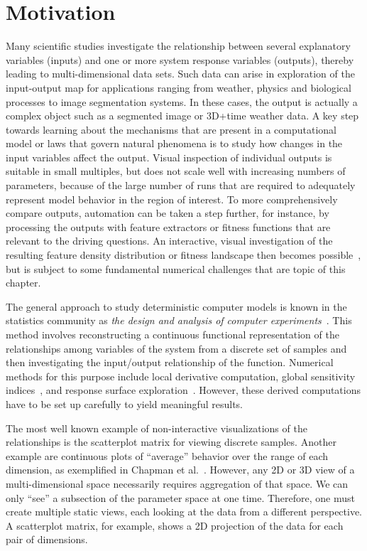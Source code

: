 
\section{Motivation}

Many scientific studies investigate the relationship between
several explanatory variables (inputs) and one or more system response
variables (outputs), thereby leading to multi-dimensional data sets.  Such data
can arise in exploration of the input-output map for applications ranging from
weather, physics and biological processes to image segmentation systems.  
In these cases, the output
is actually a complex object such as a segmented image or 3D+time weather data.
A key step towards learning about the mechanisms that are present in a
computational model or laws that govern natural phenomena is to study how
changes in the input variables affect the output.  Visual inspection of
individual outputs is suitable in small multiples, but does not scale well with
increasing numbers of parameters, because of the large number of runs that are
required to adequately represent model behavior in the region of interest.  To
more comprehensively compare outputs, automation can be taken a step further,
for instance, by processing the outputs with feature extractors or fitness
functions that are relevant to the driving questions.  An interactive, visual
investigation of the resulting feature density distribution or fitness
landscape then becomes
possible~\cite{Feiner:1990,Muhlbacher:2013,Piringer:2010}, but is subject to 
some fundamental numerical
challenges that are topic of this chapter.

The general approach to
study deterministic computer models is known in the statistics community as
\emph{the design and analysis of computer experiments}~\cite{Santner:2003}.
This method involves reconstructing a continuous functional representation of
the relationships among variables of the system from a discrete set of 
samples and then investigating the
input/output relationship of the function.  Numerical methods for
this purpose include local derivative computation, global sensitivity
indices~\cite{Saltelli:2008}, and response surface
exploration~\cite{Box:2007}.  However, these derived computations have to be
set up carefully to yield meaningful results. 

The most well known example of non-interactive visualizations of the 
relationships is the scatterplot 
matrix for viewing discrete samples.
Another example are continuous plots of ``average'' behavior over the 
range of each
dimension, as exemplified in Chapman et al.~\cite{Chapman:1994}.
However, any 2D or 3D view of a multi-dimensional space necessarily requires
aggregation of that space.
We can only ``see'' a subsection of the parameter
space at one time.
Therefore, one must create multiple static views, each looking at 
the data from a different perspective.  A scatterplot matrix, for example,
shows a 2D projection of the data for each pair of dimensions.

